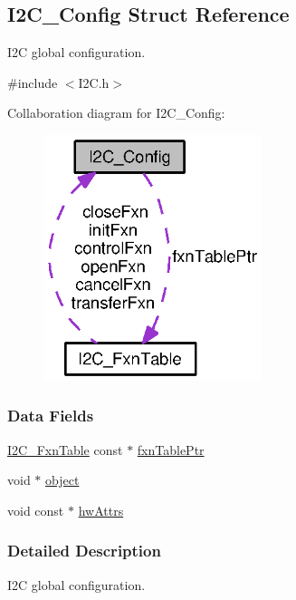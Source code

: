 \subsection{I2\+C\+\_\+\+Config Struct Reference}
\label{struct_i2_c___config}


I2\+C global configuration.  




{\ttfamily \#include $<$I2\+C.\+h$>$}



Collaboration diagram for I2\+C\+\_\+\+Config\+:
\nopagebreak
\begin{figure}[H]
\begin{center}
\leavevmode
\includegraphics[width=181pt]{struct_i2_c___config__coll__graph}
\end{center}
\end{figure}
\subsubsection*{Data Fields}
\begin{DoxyCompactItemize}
\item 
\hyperlink{struct_i2_c___fxn_table}{I2\+C\+\_\+\+Fxn\+Table} const $\ast$ \hyperlink{struct_i2_c___config_a225800ca2923178397645d520bc6a0c1}{fxn\+Table\+Ptr}
\item 
void $\ast$ \hyperlink{struct_i2_c___config_abeb7af699744bd43dc1fc5019073fd2c}{object}
\item 
void const $\ast$ \hyperlink{struct_i2_c___config_a1c623e253c0d5f896ad8037635f0c719}{hw\+Attrs}
\end{DoxyCompactItemize}


\subsubsection{Detailed Description}
I2\+C global configuration. 

